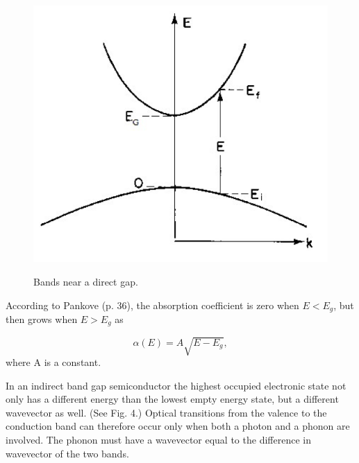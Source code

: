 \documentclass{article}
\begin{document}
\begin{figure}[!htb]
	\centering
	\includegraphics[scale=1.]{plots/fig_6.png}
 	\label{direct}
	\caption{Bands near a direct gap.\cite{lab manual}}
\end{figure}

According to Pankove (p. 36), the absorption coefficient is zero when $E < E_g$, but then grows when $E > E_g$ as

\begin{equation}
	\alpha(E) = A \sqrt{E - E_g},
\end{equation}
where A is a constant.

In an indirect band gap semiconductor the highest occupied electronic state not only has a different energy than the lowest empty energy state, but a different wavevector as well. (See Fig. 4.) Optical transitions from the valence to the conduction band can therefore occur only when both a photon and a phonon are involved. The phonon must have a wavevector equal to the difference in wavevector of the two bands.
\end{document}
